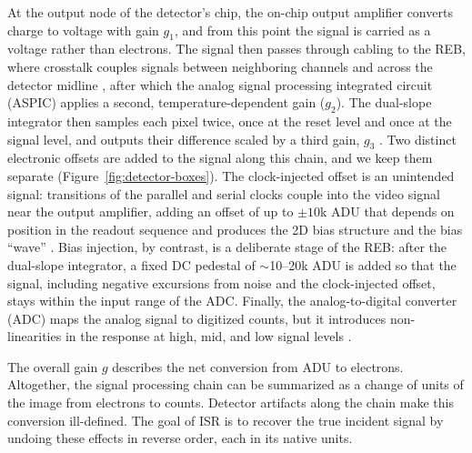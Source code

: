 At the output node of the detector's chip, the on-chip output amplifier converts charge to voltage with gain $g_1$, and from this point the signal is carried as a voltage rather than electrons.
The signal then passes through cabling to the REB, where crosstalk couples signals between neighboring channels and across the detector midline \citep{2015JInst..10C5010O}, after which the analog signal processing integrated circuit (ASPIC) applies a second, temperature-dependent gain ($g_2$).
The dual-slope integrator then samples each pixel twice, once at the reset level and once at the signal level, and outputs their difference scaled by a third gain, $g_3$ \citep{SITCOMTN-086}.
Two distinct electronic offsets are added to the signal along this chain, and we keep them separate (Figure~\ref{fig:detector-boxes}).
The clock-injected offset is an unintended signal: transitions of the parallel and serial clocks couple into the video signal near the output amplifier, adding an offset of up to $\pm10$k ADU that depends on position in the readout sequence and produces the 2D bias structure and the bias ``wave'' \citep{2026arXiv260631806M}.
Bias injection, by contrast, is a deliberate stage of the REB: after the dual-slope integrator, a fixed DC pedestal of $\sim$10--20k ADU is added so that the signal, including negative excursions from noise and the clock-injected offset, stays within the input range of the ADC.
Finally, the analog-to-digital converter (ADC) maps the analog signal to digitized counts, but it introduces non-linearities in the response at high, mid, and low signal levels \citep{RTN-055}.

The overall gain $g$ describes the net conversion from ADU to electrons.
Altogether, the signal processing chain can be summarized as a change of units of the image from electrons to counts.
Detector artifacts along the chain make this conversion ill-defined.
The goal of ISR is to recover the true incident signal by undoing these effects in reverse order, each in its native units.
